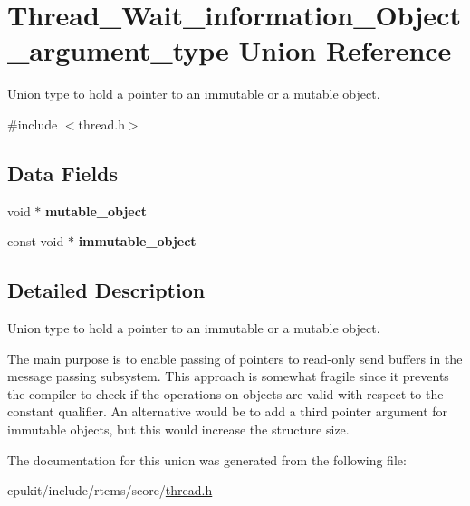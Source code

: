 \hypertarget{unionThread__Wait__information__Object__argument__type}{}\section{Thread\+\_\+\+Wait\+\_\+information\+\_\+\+Object\+\_\+argument\+\_\+type Union Reference}
\label{unionThread__Wait__information__Object__argument__type}


Union type to hold a pointer to an immutable or a mutable object.  




{\ttfamily \#include $<$thread.\+h$>$}

\subsection*{Data Fields}
\begin{DoxyCompactItemize}
\item 
\mbox{\label{unionThread__Wait__information__Object__argument__type_a0209227e36e733cecca2ed970c7a4030}} 
void $\ast$ {\bfseries mutable\+\_\+object}
\item 
\mbox{\label{unionThread__Wait__information__Object__argument__type_a3d01b4cfa57a33ae53c4f1d976634bf7}} 
const void $\ast$ {\bfseries immutable\+\_\+object}
\end{DoxyCompactItemize}


\subsection{Detailed Description}
Union type to hold a pointer to an immutable or a mutable object. 

The main purpose is to enable passing of pointers to read-\/only send buffers in the message passing subsystem. This approach is somewhat fragile since it prevents the compiler to check if the operations on objects are valid with respect to the constant qualifier. An alternative would be to add a third pointer argument for immutable objects, but this would increase the structure size. 

The documentation for this union was generated from the following file\+:\begin{DoxyCompactItemize}
\item 
cpukit/include/rtems/score/\mbox{\hyperlink{score_2thread_8h}{thread.\+h}}\end{DoxyCompactItemize}
